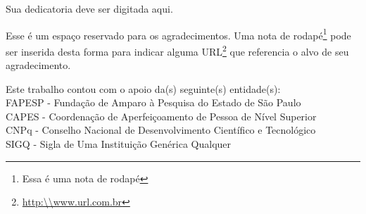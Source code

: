 \documentclass[
  12pt,		%
  a4paper,	%
  openright,%
  oneside,	%
  chapter=TITLE,		%
  section=TITLE,		%
  english,	%
  french,	%
  spanish,	%
  brazil
]{abntex2}
\begin{document}
    
    \begin{dedicatoria}
        \vspace*{\fill}
        \begin{flushright}
            Sua dedicatoria deve ser digitada aqui.
        \end{flushright}
        \vspace*{1cm}
    \end{dedicatoria}

    \begin{agradecimentos}
    
        Esse é um espaço reservado para os agradecimentos. Uma nota de rodapé\footnote{Essa é uma nota de rodapé} pode ser inserida desta forma para indicar alguma URL\footnote{\url{http:\\www.url.com.br}} que referencia o alvo de seu agradecimento.
    
    \end{agradecimentos}
    
    \vspace*{\fill}
    \begin{flushleft}
        Este trabalho contou com o apoio da(s) seguinte(s) entidade(s):\\
        FAPESP - Fundação de Amparo à Pesquisa do Estado de São Paulo\\
        CAPES - Coordenação de Aperfeiçoamento de Pessoa de Nível Superior\\
        CNPq - Conselho Nacional de Desenvolvimento Científico e Tecnológico\\
        SIGQ - Sigla de Uma Instituição Genérica Qualquer
    \end{flushleft}
    \newpage
    
\end{document}
